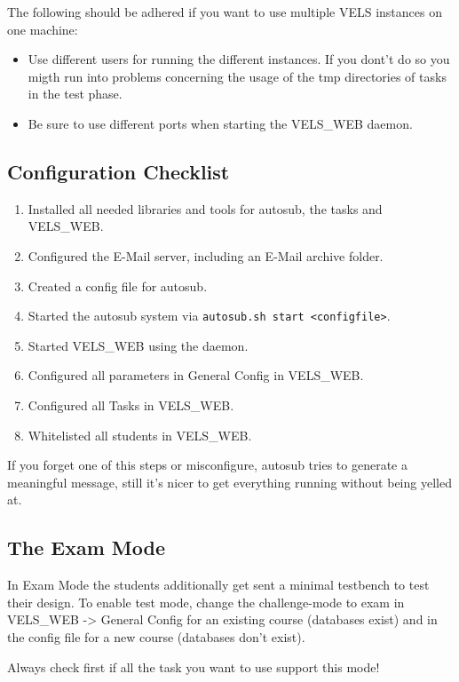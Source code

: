The following should be adhered if you want to use multiple VELS instances on
one machine:
\begin{itemize}
\item Use different users for running the different instances. If you dont't do
	so you migth run into problems concerning the usage of the tmp directories of
	tasks in the test phase.
\item Be sure to use different ports when starting the VELS\_WEB daemon.
\end{itemize}

\subsection{Configuration Checklist} \label{sub:configChecklist}

\begin{enumerate}
\item Installed all needed libraries and tools for autosub, the tasks and VELS\_WEB.
\item Configured the E-Mail server, including an E-Mail archive folder.
\item Created a config file for autosub.
\item Started the autosub system via {\tt autosub.sh start <configfile>}.
\item Started VELS\_WEB using the daemon.
\item Configured all parameters in General Config in VELS\_WEB.
\item Configured all Tasks in VELS\_WEB.
\item Whitelisted all students in VELS\_WEB.
\end{enumerate}

If you forget one of this steps or misconfigure, autosub tries to generate a meaningful
message, still it's nicer to get everything running without being yelled at.

\subsection{The Exam Mode}\label{sub:exammode}
In Exam Mode the students additionally get sent a minimal testbench to test their design.
To enable test mode, change the challenge-mode to exam in VELS\_WEB -> General Config for
an existing course (databases exist) and in the config file for a new course (databases
don't exist).

Always check first if all the task you want to use support this mode!

